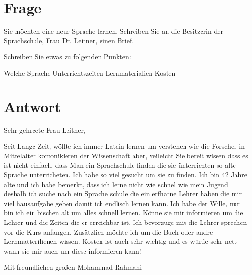 \documentclass[a4paper]{article}
\title{}
\date{}
\begin{document}
    \maketitle
    
    
    \section{Frage}
        Sie möchten eine neue Sprache lernen. Schreiben Sie an die Besitzerin der Sprachschule, Frau Dr. Leitner, einen Brief.
        
        Schreiben Sie etwas zu folgenden Punkten:
        
        Welche Sprache
        Unterrichtszeiten
        Lernmaterialien
        Kosten
    
    
    \section{Antwort}
        Sehr gehreete Frau Leitner,
        
        Seit Lange Zeit, wöllte ich immer Latein lernen um verstehen wie die Forscher in Mittelalter komonikieren der Wissenschaft aber, veileicht Sie bereit wissen dass es ist nicht einfach, dass Man ein Sprachschule finden die sie ünterrichten so alte Sprache unterricheten. Ich habe so viel gesucht um sie zu finden. Ich bin 42 Jahre alte und ich habe bemerkt, dass ich lerne nicht wie schnel wie mein Jugend deshalb ich suche nach ein Sprache schule die ein erfharne Lehrer haben die mir viel hausaufgabe geben damit ich endlisch lernen kann. Ich habe der Wille, nur bin ich ein bischen alt um alles schnell lernen. Könne sie mir informieren um die Lehrer und die Zeiten die er erreichbar ist. Ich bevorzuge mit die Lehrer sprechen vor die Kurs anfangen. Zusätzlich möchte ich um die Buch oder andre Lernmatterilienen wissen. Kosten ist auch sehr wichtig und es würde sehr nett wann sie mir auch um diese informieren kann!
        
        Mit freundlichen großen
        Mohammad Rahmani
    
\end{document}
